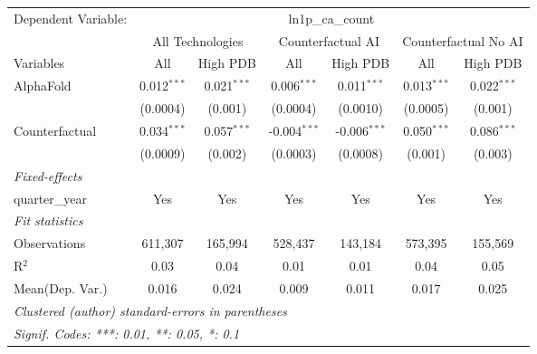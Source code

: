 \begingroup
\centering
\begin{tabular}{lcccccc}
   \tabularnewline \midrule \midrule
   Dependent Variable: & \multicolumn{6}{c}{ln1p\_ca\_count}\\
 & \multicolumn{2}{c}{All Technologies} & \multicolumn{2}{c}{Counterfactual AI} & \multicolumn{2}{c}{Counterfactual No AI} \\
\cmidrule(lr){1-1}\cmidrule(lr){2-3} \cmidrule(lr){4-5} \cmidrule(lr){6-7}
Variables & \multicolumn{1}{c}{All} & \multicolumn{1}{c}{High PDB} & \multicolumn{1}{c}{All} & \multicolumn{1}{c}{High PDB} & \multicolumn{1}{c}{All} & \multicolumn{1}{c}{High PDB} \\
\cmidrule(lr){1-1}\cmidrule(lr){2-2} \cmidrule(lr){3-3} \cmidrule(lr){4-4} \cmidrule(lr){5-5} \cmidrule(lr){6-6} \cmidrule(lr){7-7}
   AlphaFold      & 0.012$^{***}$ & 0.021$^{***}$ & 0.006$^{***}$  & 0.011$^{***}$  & 0.013$^{***}$ & 0.022$^{***}$\\   
                  & (0.0004)      & (0.001)       & (0.0004)       & (0.0010)       & (0.0005)      & (0.001)\\   
   Counterfactual & 0.034$^{***}$ & 0.057$^{***}$ & -0.004$^{***}$ & -0.006$^{***}$ & 0.050$^{***}$ & 0.086$^{***}$\\   
                  & (0.0009)      & (0.002)       & (0.0003)       & (0.0008)       & (0.001)       & (0.003)\\   
   \midrule
   \emph{Fixed-effects}\\
   quarter\_year  & Yes           & Yes           & Yes            & Yes            & Yes           & Yes\\  
   \midrule
   \emph{Fit statistics}\\
   Observations   & 611,307       & 165,994       & 528,437        & 143,184        & 573,395       & 155,569\\  
   R$^2$          & 0.03          & 0.04          & 0.01           & 0.01           & 0.04          & 0.05\\  
Mean(Dep. Var.) & 0.016 & 0.024 & 0.009 & 0.011 & 0.017 & 0.025 \\
   \midrule \midrule
   \multicolumn{7}{l}{\emph{Clustered (author) standard-errors in parentheses}}\\
   \multicolumn{7}{l}{\emph{Signif. Codes: ***: 0.01, **: 0.05, *: 0.1}}\\
\end{tabular}
\par\endgroup
